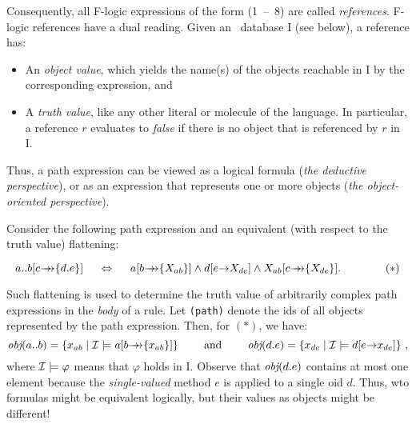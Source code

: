 \documentclass[11pt]{report}
\begin{document}
Consequently, all F-logic expressions of the form (1~--~8) are called
\emph{references}. F-logic references have a dual reading. Given an
\fl\ database \db I (see below), a reference has:
\begin{itemize}
\item An \emph{object value}, which yields the name(s) of the objects
  reachable in \db I by the corresponding expression, and 
\item A \emph{truth value}, like any other literal or molecule of the
  language. In particular, a reference $r$ evaluates to \emph{false} if
  there is no object that is referenced by $r$ in \db I.
\end{itemize}
Thus, a path expression can be viewed as a logical formula (\emph{the
  deductive perspective}), or as an expression that represents one or more
objects (\emph{the object-oriented perspective}).

Consider the following path expression and an equivalent (with respect to
the truth value) flattening:

\begin{displaymath}
a..b[c\mvd\{d.e\}] \quad\ \Leftrightarrow \quad\  a[b\mvd\{X_{ab}\}]
\land d[e\fd X_{de}] \land X_{ab}[c\mvd\{X_{de}\}]. \hspace{4em} (*)
\end{displaymath}


\noindent
Such flattening is used to determine the truth value of arbitrarily complex
path expressions in the \emph{body} of a rule.  Let {\tt \obj(path)} denote
the ids of all objects represented by the path expression. Then, for $(*)$,
we have:
\begin{displaymath}
\textit{obj}(a..b) = \{x_{ab} \mid \mathcal{I} \models a[b{\rightarrow\!\!\!\!\rightarrow}\{x_{ab}\}]\}
\qquad\textrm{ and }\qquad \textit{obj}(d.e) = \{x_{de} \mid \mathcal{I} \models d[e{\rightarrow} 
x_{de}]\} ~,
\end{displaymath}
%
where $\mathcal{I} \models \varphi$ means that $\varphi$ holds in \db I.
Observe that $\textit{obj}(d.e)$ contains at most one element because the
\emph{single-valued} method $e$ is applied to a single oid $d$. Thus, wto
formulas might be equivalent logically, but their values as objects might
be different!
\end{document}
